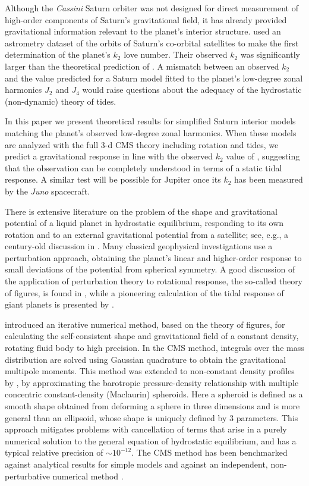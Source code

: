 Although the \textit{Cassini} Saturn orbiter was not designed for direct measurement
of high-order components of Saturn's gravitational field, it has already provided
gravitational information relevant to the planet's interior structure.
\citet{lainey2016} used an astrometry dataset of the orbits of Saturn's co-orbital
satellites to make the first determination of the planet's $k_2$ love number. Their
observed $k_2$ was significantly larger than the theoretical prediction of
\citet{gavrilov1977}. A mismatch between an observed $k_2$ and the value predicted
for a Saturn model fitted to the planet's low-degree zonal harmonics $J_2$ and $J_4$
would raise questions about the adequacy of the hydrostatic (non-dynamic) theory of
tides.  

In this paper we present theoretical results for simplified Saturn interior models
matching the planet's observed low-degree zonal harmonics.  When these models are
analyzed with the full 3-d CMS theory including rotation and tides, we predict a
gravitational response in line with the observed $k_2$ value of \citet{lainey2016},
suggesting that the observation can be completely understood in terms of a static
tidal response.  A similar test will be possible for Jupiter once its $k_2$ has been
measured by the \textit{Juno} spacecraft.

There is extensive literature on the problem of the shape and gravitational potential
of a liquid planet in hydrostatic equilibrium, responding to its own rotation and to
an external gravitational potential from a satellite; see, e.g., a century-old
discussion in \citet{jeans1919}.  Many classical geophysical investigations use a
perturbation approach, obtaining the planet's linear and higher-order response to
small deviations of the potential from spherical symmetry. A good discussion of the
application of perturbation theory to rotational response, the so-called theory of
figures, is found in \citet{zharkov1978}, while a pioneering calculation of the tidal
response of giant planets is presented by \citet{gavrilov1977}.

\citet{hubbard2012} introduced an iterative numerical method, based on the theory of
figures, for calculating the self-consistent shape and gravitational field of a
constant density, rotating fluid body to high precision. In the CMS method, integrals
over the mass distribution are solved using Gaussian quadrature to obtain the
gravitational multipole moments. This method was extended to non-constant density
profiles by \citet{hubbard2013}, by approximating the barotropic pressure-density
relationship with multiple concentric constant-density (Maclaurin) spheroids.  Here a
spheroid is defined as a smooth shape obtained from deforming a sphere in three
dimensions and is more general than an ellipsoid, whose shape is uniquely defined
by 3 parameters.  This approach mitigates problems with cancellation of
terms that arise in a purely numerical solution to the general equation of
hydrostatic equilibrium, and has a typical relative precision of $\sim 10^{-12}$. The
CMS method has been benchmarked against analytical results for simple models
\citep{hubbard2014} and against an independent, non-perturbative numerical method
\citep{wisdom1996,wisdom2016}. 

